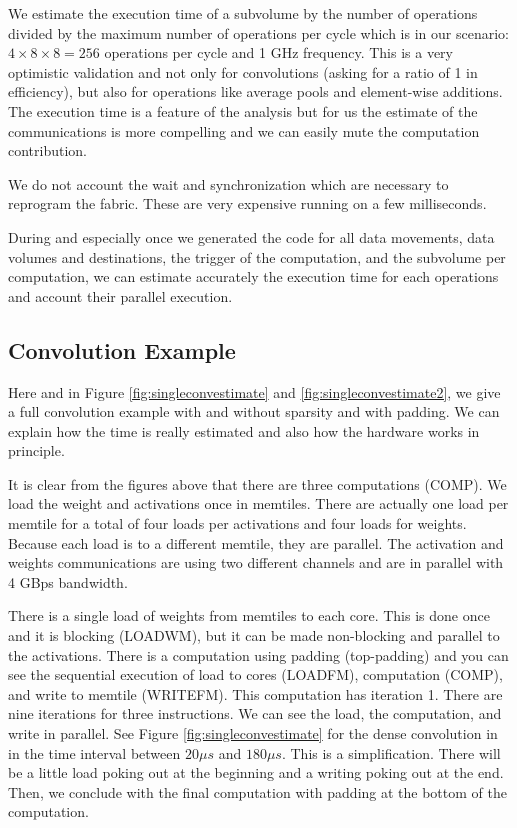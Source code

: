 \documentclass[conference]{IEEEtran}
\begin{document}
We estimate the execution time of a subvolume by the number of
operations divided by the maximum number of operations per cycle which
is in our scenario: $4\times 8 \times 8 = 256 $ operations per cycle
and 1 GHz frequency. This is a very optimistic validation and not only
for convolutions (asking for a ratio of 1 in efficiency), but also for
operations like average pools and element-wise additions. The
execution time is a feature of the analysis but for us the estimate of
the communications is more compelling and we can easily mute the
computation contribution.

We do not account the wait and synchronization which are necessary to reprogram
the fabric. These are very expensive running on a few milliseconds.

During and especially once we generated the code for all data
movements, data volumes and destinations, the trigger of the
computation, and the subvolume per computation, we can estimate 
accurately the execution time for each operations and account their
parallel execution.

\subsection{Convolution Example}
Here and in Figure \ref{fig:singleconvestimate} and
\ref{fig:singleconvestimate2}, we give a full convolution example with
and without sparsity and with padding. We can explain how the time is
really estimated and also how the hardware works in principle.

It is clear from the figures above that there are three computations
(COMP). We load the weight and activations once in memtiles. There are
actually one load per memtile for a total of four loads per
activations and four loads for weights. Because each load is to a
different memtile, they are parallel.  The activation and weights
communications are using two different channels and are in
parallel with 4 GBps bandwidth.

There is a single load of weights from memtiles to each core. This is
done once and it is blocking (LOADWM), but it can be made non-blocking
and parallel to the activations. There is a computation using padding
(top-padding) and you can see the sequential execution of load to
cores (LOADFM), computation (COMP), and write to memtile
(WRITEFM). This computation has iteration 1. There are nine iterations
for three instructions. We can see the load, the computation, and
write in parallel. See Figure \ref{fig:singleconvestimate} for the
dense convolution in in the time interval between $20 \mu\!s$ and
$180 \mu\!s$.  This is a simplification. There will be a
little load poking out at the beginning and a writing poking out at
the end.  Then, we conclude with the final computation with padding at
the bottom of the computation.
\end{document}
